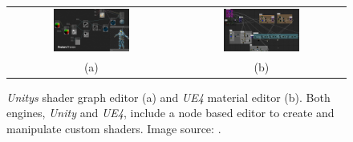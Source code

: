 \begin{figure}
	\centering\small 
	\begin{tabular}{@{}cc@{}}
		\includegraphics[width=0.475\textwidth]{images/05cha_01_unityShaderGraph.jpg} &		%
		\includegraphics[width=0.475\textwidth]{images/05cha_01_shaderGraphUE_02.jpg} \\	%
		(a) & (b) 
	\end{tabular}
	\caption{\emph{Unitys} shader graph editor (a) and \emph{UE4} material editor (b).
		Both engines, \emph{Unity} and \emph{UE4}, include a node based editor to create and manipulate custom shaders. Image source: \cite{cooper2018visualEditor}. }
	\label{fig:shadergraphs}
\end{figure}


